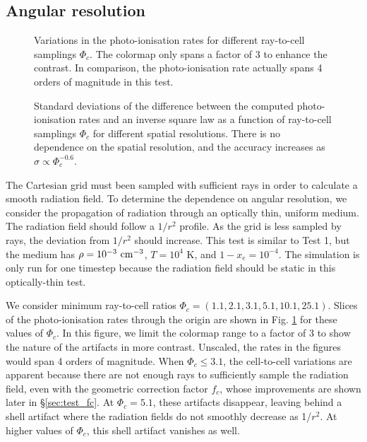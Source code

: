 \documentclass[useAMS,usenatbib]{mn2e}
\begin{document}
\subsection{Angular resolution}
\label{sec:ang_dep}

\begin{figure}
  \caption{\label{fig:ang_dep1} Variations in the photo-ionisation
    rates for different ray-to-cell samplings $\Phi_c$.  The colormap
    only spans a factor of 3 to enhance the contrast.  In comparison,
    the photo-ionisation rate actually spans 4 orders of magnitude in
    this test.}
\end{figure}

\begin{figure}
  \caption{\label{fig:ang_dep2} Standard deviations of the difference
    between the computed photo-ionisation rates and an inverse square
    law as a function of ray-to-cell samplings $\Phi_c$ for different
    spatial resolutions.  There is no dependence on the spatial
    resolution, and the accuracy increases as $\sigma \propto
    \Phi_c^{-0.6}$.}
\end{figure}

The Cartesian grid must been sampled with sufficient rays in order to
calculate a smooth radiation field.  To determine the dependence on
angular resolution, we consider the propagation of radiation through
an optically thin, uniform medium.  The radiation field should follow
a $1/r^2$ profile.  As the grid is less sampled by rays, the deviation
from $1/r^2$ should increase.  This test is similar to Test 1, but the
medium has $\rho = 10^{-3}~\cubecm$, $T = 10^4$ K, and $1 - x_e =
10^{-4}$.  The simulation is only run for one timestep because the
radiation field should be static in this optically-thin test.

We consider minimum ray-to-cell ratios $\Phi_c = (1.1, 2.1, 3.1, 5.1,
10.1, 25.1)$.  Slices of the photo-ionisation rates through the origin
are shown in Fig. \ref{fig:ang_dep1} for these values of $\Phi_c$.
In this figure, we limit the colormap range to a factor of 3 to show
the nature of the artifacts in more contrast.  Unscaled, the rates in
the figures would span 4 orders of magnitude.  When $\Phi_c \le 3.1$,
the cell-to-cell variations are apparent because there are not enough
rays to sufficiently sample the radiation field, even with the
geometric correction factor $f_c$, whose improvements are shown later
in \S\ref{sec:test_fc}.  At $\Phi_c = 5.1$, these artifacts disappear,
leaving behind a shell artifact where the radiation fields do not
smoothly decrease as 1/$r^2$.  At higher values of $\Phi_c$, this
shell artifact vanishes as well.  
\end{document}
